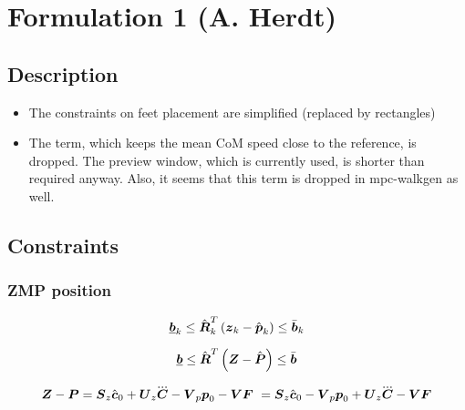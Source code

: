 \section{Formulation 1 (A. Herdt)}\label{sec.form01}


\subsection{Description}
\begin{itemize}
    \item The constraints on feet placement are simplified (replaced by rectangles)
    \item The term, which keeps the mean CoM speed close to the reference, is dropped. The preview window,
    which is currently used, is shorter than required anyway. Also, it seems that this term is dropped
    in mpc-walkgen as well.
\end{itemize}



\subsection{Constraints}

\subsubsection{ZMP position}
\begin{equation*}
    \underline{\mbox{\boldmath $b$}}_k \le \hat{\mbox{\boldmath $R$}}_k^T \left( \mbox{\boldmath $z$}_k - \hat{\mbox{\boldmath $p$}}_k \right) \le \bar{\mbox{\boldmath $b$}}_k\\
\end{equation*}

\begin{equation*}
    \underline{\mbox{\boldmath $b$}} 
    \le 
    \hat{\mbox{\boldmath $R$}}^T
    \left(
        \mbox{\boldmath $Z$}
        -
        \hat{\mbox{\boldmath $P$}}
    \right) 
    \le
    \bar{\mbox{\boldmath $b$}}
\end{equation*}


\begin{equation*}
    \ZMP - \FP 
    =
    \M{S}_z \cstate_0  +  \M{U}_z \cJerk - \M{V}_p \fp_0 - \M{V} \FD\
    =
    \M{S}_z \cstate_0 - \M{V}_p \fp_0
    +
    \M{U}_z \cJerk - \M{V} \FD
\end{equation*}

